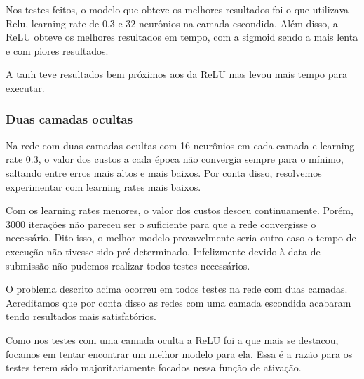 \documentclass[conference]{IEEEtran}
\begin{document}
	Nos testes feitos, o modelo que obteve os melhores resultados foi o que utilizava Relu, learning rate de 0.3 e 32 neurônios na camada escondida. Além disso, a ReLU obteve os melhores resultados em tempo, com a sigmoid sendo a mais lenta e com piores resultados.
	
	A tanh teve resultados bem próximos aos da ReLU mas levou mais tempo para executar.

\subsubsection{Duas camadas ocultas}

	Na rede com duas camadas ocultas com 16 neurônios em cada camada e learning rate 0.3, o valor dos custos a cada época não convergia sempre para o mínimo, saltando entre erros mais altos e mais baixos. Por conta disso, resolvemos experimentar com learning rates mais baixos.
	
	Com os learning rates menores, o valor dos custos desceu continuamente. Porém, 3000 iterações não pareceu ser o suficiente para que a rede convergisse o necessário. Dito isso, o melhor modelo provavelmente seria outro caso o tempo de execução não tivesse sido pré-determinado. Infelizmente devido à data de submissão não pudemos realizar todos testes necessários.
	
	O problema descrito acima ocorreu em todos testes na rede com duas camadas. Acreditamos que por conta disso as redes com uma camada escondida acabaram tendo resultados mais satisfatórios.
	
	Como nos testes com uma camada oculta a ReLU foi a que mais se destacou, focamos em tentar encontrar um melhor modelo para ela. Essa é a razão para os testes terem sido majoritariamente focados nessa função de ativação.
\end{document}
